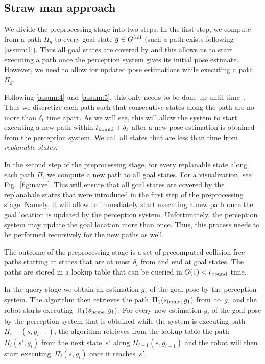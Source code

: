 \documentclass[conference]{IEEEtran}
\begin{document}
\subsection{Straw man approach}
We divide the preprocessing stage into two steps.
In the first step, we compute from \Shome a path $\Pi_g$ to every goal state $ g \in G^{\textrm{full}}$ (such a path exists following \ref{assum:1}).
Thus all goal states are covered by \Shome and this allows us to start executing a path once the perception system gives its initial pose estimate.
However, we need to allow for updated pose estimations while executing a path $\Pi_g$. 

%
Following \ref{assum:4} and \ref{assum:5}, this only needs to be done up until time~\Trc.
Thus we discretize each path such that consecutive states along the path are no more than $\delta _t$ time apart. As we will see, this will allow the system to start executing a new path within $t_{\textrm{bound}} + \delta_t$ after a new pose estimation is obtained from the perception system.
%
We call all states that are less than \Trc time from \Shome \emph{replanable states}.


In the second step of the preprocessing stage, for every replanable state along each path $\Pi$, we compute a new path to all goal states.
For a visualization, see Fig.~\ref{fig:naive}.
%
This will ensure that all goal states are covered by the replanabale states that were introduced in the first step of the preprocessing stage. Namely, it will allow to immediately start executing a new path once the goal location is updated by the perception system.
%
Unfortunately, the perception system may update the goal location more than once. Thus, this process needs to be performed recursively for the new paths as well.


The outcome of the preprocessing stage is a set of precomputed collision-free paths starting at states that are at most $\delta_t$ from \Shome {} and end at goal states.
The paths are stored in a lookup table that can be queried in $O(1) < t_{\textrm{bound}}$ time.

In the query stage we obtain an estimation $g_1$ of the goal pose by the perception system. 
The algorithm then retrieves the path~$\Pi_1(s_{\textrm{home}},g_1)$ from~\Shome to~$g_1$ and the robot starts executing~$\Pi_1(s_{\textrm{home}},g_1)$.
%
For every new estimation $g_i$ of the goal pose by the perception system that is obtained while the system is executing path $\Pi_{i-1}(s,g_{i-1})$, the algorithm retrieves from the lookup table the path $\Pi_i(s',g_i)$ from the next state~$s'$ along $\Pi_{i-1}(s,g_{i-1})$ and the robot will then start executing~$\Pi_i(s,g_i)$ once it reaches~$s'$.
\end{document}
